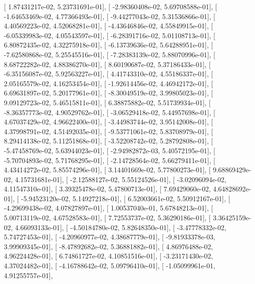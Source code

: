 \documentclass{article}
\begin{document}
       [  1.87431217e-02,   5.23731691e-01],
       [ -2.98360408e-02,   5.69708588e-01],
       [ -1.64653469e-02,   4.77366493e-01],
       [ -9.44277043e-02,   5.31536866e-01],
       [  4.40569223e-02,   4.52068281e-01],
       [ -4.43646846e-02,   4.55849915e-01],
       [ -6.05339983e-02,   4.05543597e-01],
       [ -6.28391716e-02,   5.01108713e-01],
       [  6.80872435e-02,   4.32275918e-01],
       [ -6.13739636e-02,   5.64288951e-01],
       [ -7.62580868e-02,   5.25545516e-01],
       [ -7.28383139e-02,   5.88070996e-01],
       [  8.68722282e-02,   4.88386270e-01],
       [  8.60190687e-02,   5.37186433e-01],
       [ -6.35156087e-02,   5.92563227e-01],
       [  4.41743310e-02,   4.55186337e-01],
       [  2.05165579e-02,   4.16253454e-01],
       [ -1.92614456e-02,   4.46942172e-01],
       [  6.69631897e-02,   5.20177961e-01],
       [ -8.30049519e-02,   3.99805023e-01],
       [  9.09129723e-02,   5.46515811e-01],
       [  6.38875882e-02,   5.51739934e-01],
       [ -8.36357773e-02,   4.90529762e-01],
       [ -3.06529418e-02,   5.44957698e-01],
       [  4.67037429e-02,   4.96622400e-01],
       [ -3.44983744e-02,   3.95142008e-01],
       [  4.37998791e-02,   4.51492035e-01],
       [ -9.53771061e-02,   5.83708979e-01],
       [  8.29414138e-02,   5.11251868e-01],
       [ -3.52208742e-02,   5.28792808e-01],
       [ -5.47458769e-02,   5.63944023e-01],
       [ -2.94982872e-03,   5.40572195e-01],
       [ -5.70704893e-02,   5.71768295e-01],
       [ -2.14728564e-02,   5.66279411e-01],
       [  4.43414272e-02,   5.85574296e-01],
       [  3.14401669e-02,   5.77800273e-01],
       [  9.68869429e-02,   4.15731681e-01],
       [ -2.12588127e-02,   5.55124526e-01],
       [ -3.02096094e-02,   4.11547310e-01],
       [  3.39325478e-02,   5.47800713e-01],
       [  7.69429060e-02,   4.64828692e-01],
       [ -5.94523120e-02,   5.14927218e-01],
       [  6.52003661e-02,   5.50912167e-01],
       [ -4.29699438e-02,   4.07827897e-01],
       [  1.00537040e-01,   5.67848213e-01],
       [  5.00713119e-02,   4.67528583e-01],
       [  7.72553737e-02,   5.36290186e-01],
       [  3.36425159e-02,   4.66093133e-01],
       [ -4.50184780e-02,   5.82648350e-01],
       [ -3.47778332e-02,   5.74727453e-01],
       [ -4.20960977e-02,   4.38687779e-01],
       [ -9.81933378e-03,   3.99909345e-01],
       [ -8.47892682e-02,   5.36881882e-01],
       [  4.86976488e-02,   4.96224428e-01],
       [  6.74861727e-02,   4.10851516e-01],
       [ -3.23171430e-02,   4.37024482e-01],
       [ -4.16788642e-02,   5.09796410e-01],
       [ -1.05099961e-01,   4.91255757e-01],
\end{document}
